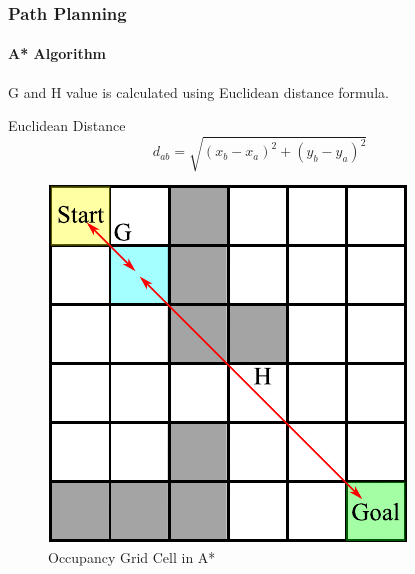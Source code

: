 \begin{frame}
	\frametitle{Path Planning}
	\framesubtitle{A* Algorithm}
	G and H value is calculated using Euclidean distance formula.
	\begin{block}{Euclidean Distance}
		\begin{equation}
			d_{ab} = \sqrt{(x_b - x_a)^2 + (y_b - y_a)^2}
		\end{equation}
	\end{block}
	\begin{figure}
		\caption{Occupancy Grid Cell in A*}
		\includegraphics[scale=0.6]{image/astar_eudis.pdf}
	\end{figure}
\end{frame}



